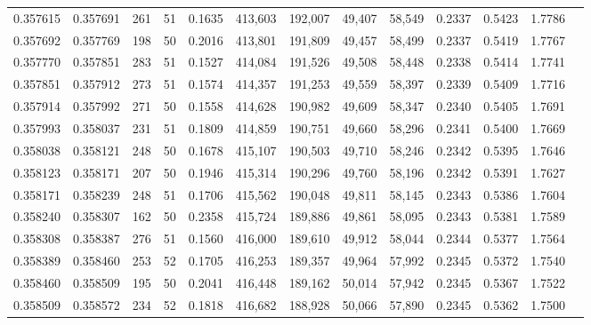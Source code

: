 \begin{tabular}{rrrrrrrrrrrrr}
0.357615 & 0.357691 &   261 &  51 &                                     0.1635 & 413,603 & 192,007 &  49,407 &  58,549 & 0.2337 & 0.5423 & 1.7786 \\
0.357692 & 0.357769 &   198 &  50 &                                     0.2016 & 413,801 & 191,809 &  49,457 &  58,499 & 0.2337 & 0.5419 & 1.7767 \\
0.357770 & 0.357851 &   283 &  51 &                                     0.1527 & 414,084 & 191,526 &  49,508 &  58,448 & 0.2338 & 0.5414 & 1.7741 \\
0.357851 & 0.357912 &   273 &  51 &                                     0.1574 & 414,357 & 191,253 &  49,559 &  58,397 & 0.2339 & 0.5409 & 1.7716 \\
0.357914 & 0.357992 &   271 &  50 &                                     0.1558 & 414,628 & 190,982 &  49,609 &  58,347 & 0.2340 & 0.5405 & 1.7691 \\
0.357993 & 0.358037 &   231 &  51 &                                     0.1809 & 414,859 & 190,751 &  49,660 &  58,296 & 0.2341 & 0.5400 & 1.7669 \\
0.358038 & 0.358121 &   248 &  50 &                                     0.1678 & 415,107 & 190,503 &  49,710 &  58,246 & 0.2342 & 0.5395 & 1.7646 \\
0.358123 & 0.358171 &   207 &  50 &                                     0.1946 & 415,314 & 190,296 &  49,760 &  58,196 & 0.2342 & 0.5391 & 1.7627 \\
0.358171 & 0.358239 &   248 &  51 &                                     0.1706 & 415,562 & 190,048 &  49,811 &  58,145 & 0.2343 & 0.5386 & 1.7604 \\
0.358240 & 0.358307 &   162 &  50 &                                     0.2358 & 415,724 & 189,886 &  49,861 &  58,095 & 0.2343 & 0.5381 & 1.7589 \\
0.358308 & 0.358387 &   276 &  51 &                                     0.1560 & 416,000 & 189,610 &  49,912 &  58,044 & 0.2344 & 0.5377 & 1.7564 \\
0.358389 & 0.358460 &   253 &  52 &                                     0.1705 & 416,253 & 189,357 &  49,964 &  57,992 & 0.2345 & 0.5372 & 1.7540 \\
0.358460 & 0.358509 &   195 &  50 &                                     0.2041 & 416,448 & 189,162 &  50,014 &  57,942 & 0.2345 & 0.5367 & 1.7522 \\
0.358509 & 0.358572 &   234 &  52 &                                     0.1818 & 416,682 & 188,928 &  50,066 &  57,890 & 0.2345 & 0.5362 & 1.7500 \\

\end{tabular}
